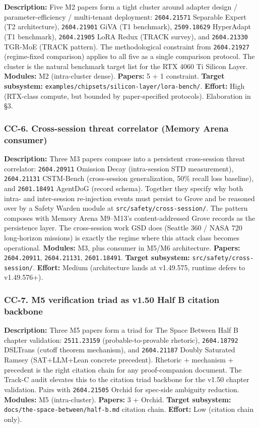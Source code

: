 \documentclass[11pt,letterpaper]{article}
\newcommand{\arxivid}[1]{\texttt{\textcolor{accent}{#1}}}
\begin{document}
\textbf{Description:} Five M2 papers form a tight cluster around adapter
design / parameter-efficiency / multi-tenant deployment:
\arxivid{2604.21571} Separable Expert (T2 architecture),
\arxivid{2604.21901} GiVA (T1 benchmark), \arxivid{2509.18629} HyperAdapt
(T1 benchmark), \arxivid{2604.21905} LoRA Redux (TRACK survey), and
\arxivid{2604.21330} TGR-MoE (TRACK pattern). The methodological
constraint from \arxivid{2604.21927} (regime-fixed comparison) applies to
all five as a single comparison protocol. The cluster is the natural
benchmark target list for the RTX 4060 Ti Silicon Layer.
\textbf{Modules:} M2 (intra-cluster dense). \textbf{Papers:} 5 + 1
constraint. \textbf{Target subsystem:}
\texttt{examples/chipsets/silicon-layer/lora-bench/}. \textbf{Effort:}
High (RTX-class compute, but bounded by paper-specified protocols).
Elaboration in §3.

\subsubsection{CC-6. Cross-session threat correlator (Memory Arena
consumer)}

\textbf{Description:} Three M3 papers compose into a persistent
cross-session threat correlator: \arxivid{2604.20911} Omission Decay
(intra-session STD measurement), \arxivid{2604.21131} CSTM-Bench
(cross-session generalization, 50\% recall loss baseline), and
\arxivid{2601.18491} AgentDoG (record schema). Together they specify why
both intra- and inter-session re-injection events must persist to Grove
and be reasoned over by a Safety Warden module at
\texttt{src/safety/cross-session/}. The pattern composes with Memory
Arena M9--M13's content-addressed Grove records as the persistence
layer. The cross-session work GSD does (Seattle 360 / NASA 720
long-horizon missions) is exactly the regime where this attack class
becomes operational. \textbf{Modules:} M3, plus consumer in M5/M6
architecture. \textbf{Papers:} \arxivid{2604.20911}, \arxivid{2604.21131}, \arxivid{2601.18491}.
\textbf{Target subsystem:} \texttt{src/safety/cross-session/}.
\textbf{Effort:} Medium (architecture lands at v1.49.575, runtime defers
to v1.49.576+).

\subsubsection{CC-7. M5 verification triad as v1.50 Half B citation
backbone}

\textbf{Description:} Three M5 papers form a triad for The Space Between
Half B chapter validation: \arxivid{2511.23159} (probable-to-provable
rhetoric), \arxivid{2604.18792} DSLTrans (cutoff theorem mechanism), and
\arxivid{2604.21187} Doubly Saturated Ramsey (SAT+LLM+Lean concrete
precedent). Rhetoric + mechanism + precedent is the right citation chain
for any proof-companion document. The Track-C audit elevates this to the
citation triad backbone for the v1.50 chapter validation. Pairs with
\arxivid{2604.21505} Orchid for spec-side ambiguity reduction.
\textbf{Modules:} M5 (intra-cluster). \textbf{Papers:} 3 + Orchid.
\textbf{Target subsystem:} \texttt{docs/the-space-between/half-b.md}
citation chain. \textbf{Effort:} Low (citation chain only).
\end{document}
